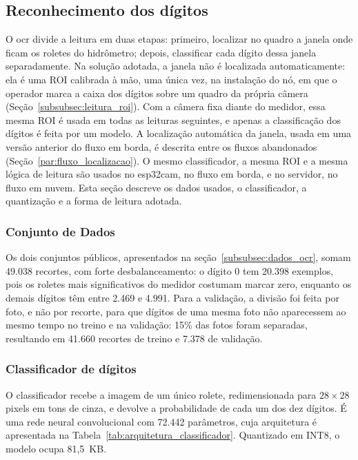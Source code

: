 \subsection{Reconhecimento dos dígitos}
\label{subsec:ocr_desenvolvimento}

O \gls{ocr} divide a leitura em duas etapas: primeiro, localizar no quadro a janela onde
ficam os roletes do hidrômetro; depois, classificar cada dígito dessa janela
separadamente. Na solução adotada, a janela não é localizada automaticamente: ela
é uma ROI calibrada à mão, uma única vez, na instalação do nó, em que o operador marca a
caixa dos dígitos sobre um quadro da própria câmera
(Seção~\ref{subsubsec:leitura_roi}). Com a câmera fixa diante do medidor, essa mesma ROI é
usada em todas as leituras seguintes, e apenas a classificação dos dígitos é feita por um
modelo. A localização automática da janela, usada em uma versão anterior do fluxo em
borda, é descrita entre os fluxos abandonados (Seção~\ref{par:fluxo_localizacao}). O mesmo
classificador, a mesma ROI e a mesma lógica de leitura são usados no \gls{esp32cam}, no
fluxo em borda, e no servidor, no fluxo em nuvem. Esta seção descreve os dados usados, o
classificador, a quantização e a forma de leitura adotada.

\subsubsection{Conjunto de Dados}
Os dois conjuntos públicos, apresentados na seção~\ref{subsubsec:dados_ocr}, somam 49.038 recortes, 
com forte desbalanceamento: o dígito 0 tem 20.398 exemplos, 
pois os roletes mais significativos do medidor costumam marcar zero,
enquanto os demais dígitos têm entre 2.469 e 4.991. Para a validação, a divisão foi feita
por foto, e não por recorte, para que dígitos de uma mesma foto não aparecessem ao mesmo
tempo no treino e na validação: 15\% das fotos foram separadas, resultando em 41.660
recortes de treino e 7.378 de validação.

\subsubsection{Classificador de dígitos}
\label{subsubsec:classificador}

O classificador recebe a imagem de um único rolete, redimensionada para $28 \times 28$
pixels em tons de cinza, e devolve a probabilidade de cada um dos dez dígitos. É uma rede
neural convolucional com 72.442 parâmetros, cuja arquitetura é apresentada na
Tabela~\ref{tab:arquitetura_classificador}. Quantizado em INT8, o modelo ocupa 81,5~KB.


